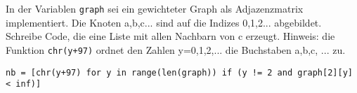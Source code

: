 ﻿\question[3]
In der Variablen \texttt{graph} sei ein gewichteter Graph als Adjazenzmatrix implementiert.
Die Knoten a,b,c... sind auf die Indizes 0,1,2... abgebildet.
Schreibe Code, die eine Liste mit allen Nachbarn von c erzeugt.
Hinweis: die Funktion \texttt{chr(y+97)} ordnet den Zahlen y=0,1,2,... die Buchstaben
a,b,c, ... zu.

\begin{solutionbox}{2cm}
\begin{lstlisting}
nb = [chr(y+97) for y in range(len(graph)) if (y != 2 and graph[2][y] < inf)]

\end{lstlisting}
\end{solutionbox}
